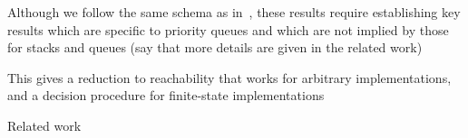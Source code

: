 Although we follow the same schema as in~\cite{DBLP:conf/icalp/BouajjaniEEH15}, these results require establishing key results which are specific to priority queues and which are not implied by those for stacks and queues (say that more details are given in the related work)

This gives a reduction to reachability that works for arbitrary implementations, and a decision procedure for finite-state implementations




\smallskip

\noindent Related work



